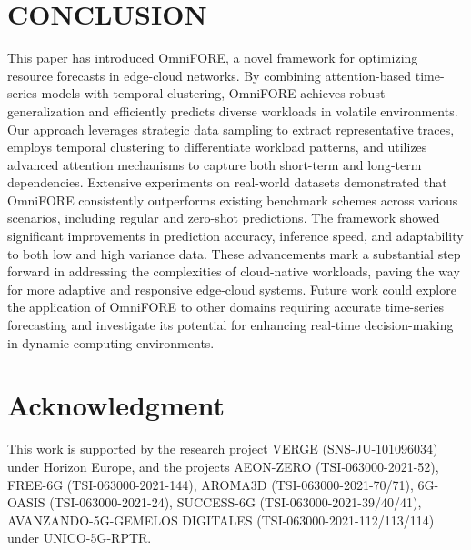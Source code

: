 \documentclass{ieeetmlcn}
\begin{document}


\section*{CONCLUSION}
\label{sec: Conclusion}
This paper has introduced OmniFORE, a novel framework for optimizing resource forecasts in edge-cloud networks. By combining attention-based time-series models with temporal clustering, OmniFORE achieves robust generalization and efficiently predicts diverse workloads in volatile environments. Our approach leverages strategic data sampling to extract representative traces, employs temporal clustering to differentiate workload patterns, and utilizes advanced attention mechanisms to capture both short-term and long-term dependencies. Extensive experiments on real-world datasets demonstrated that OmniFORE consistently outperforms existing benchmark schemes across various scenarios, including regular and zero-shot predictions. The framework showed significant improvements in prediction accuracy, inference speed, and adaptability to both low and high variance data. These advancements mark a substantial step forward in addressing the complexities of cloud-native workloads, paving the way for more adaptive and responsive edge-cloud systems. Future work could explore the application of OmniFORE to other domains requiring accurate time-series forecasting and investigate its potential for enhancing real-time decision-making in dynamic computing environments.

\section*{Acknowledgment}
This work is supported by the research project VERGE (SNS-JU-101096034) under Horizon Europe, and the projects AEON-ZERO (TSI-063000-2021-52), FREE-6G (TSI-063000-2021-144), AROMA3D (TSI-063000-2021-70/71), 6G-OASIS (TSI-063000-2021-24), SUCCESS-6G (TSI-063000-2021-39/40/41), AVANZANDO-5G-GEMELOS DIGITALES (TSI-063000-2021-112/113/114) under UNICO-5G-RPTR.
\end{document}
